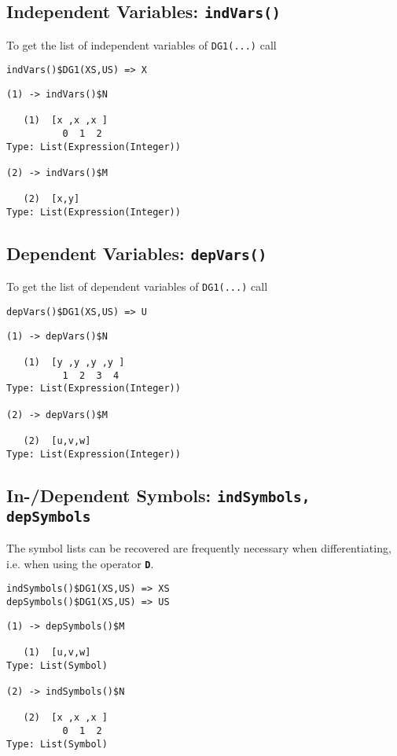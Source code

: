 \documentclass[12pt,a4paper]{article}
\newcommand{\spadbold}[1]{{\tt\bf #1}}
\begin{document}
\subsection{Independent Variables: {\tt indVars()}}
To get the list of independent variables of {\tt DG1(...)} call
\begin{lstlisting}
indVars()$DG1(XS,US) => X
\end{lstlisting} 
\scriptsize
\begin{verbatim}
(1) -> indVars()$N

   (1)  [x ,x ,x ]
          0  1  2
Type: List(Expression(Integer)) 

(2) -> indVars()$M

   (2)  [x,y]
Type: List(Expression(Integer))
\end{verbatim} 
\normalsize
%
\subsection{Dependent Variables: {\tt depVars()}}
To get the list of dependent variables of {\tt DG1(...)} call
\begin{lstlisting}
depVars()$DG1(XS,US) => U
\end{lstlisting} 
\scriptsize
\begin{verbatim}
(1) -> depVars()$N

   (1)  [y ,y ,y ,y ]
          1  2  3  4
Type: List(Expression(Integer)) 

(2) -> depVars()$M

   (2)  [u,v,w]
Type: List(Expression(Integer))
\end{verbatim} 
\normalsize
%
\subsection{In-/Dependent Symbols: {\tt indSymbols, depSymbols}}
The symbol lists can be recovered are frequently necessary when
differentiating, i.e. when using the operator \spadbold{D}.
\begin{lstlisting}
indSymbols()$DG1(XS,US) => XS
depSymbols()$DG1(XS,US) => US
\end{lstlisting}
\scriptsize
\begin{verbatim}
(1) -> depSymbols()$M

   (1)  [u,v,w]
Type: List(Symbol)

(2) -> indSymbols()$N

   (2)  [x ,x ,x ]
          0  1  2
Type: List(Symbol)
\end{verbatim}
\normalsize
%
\end{document}

